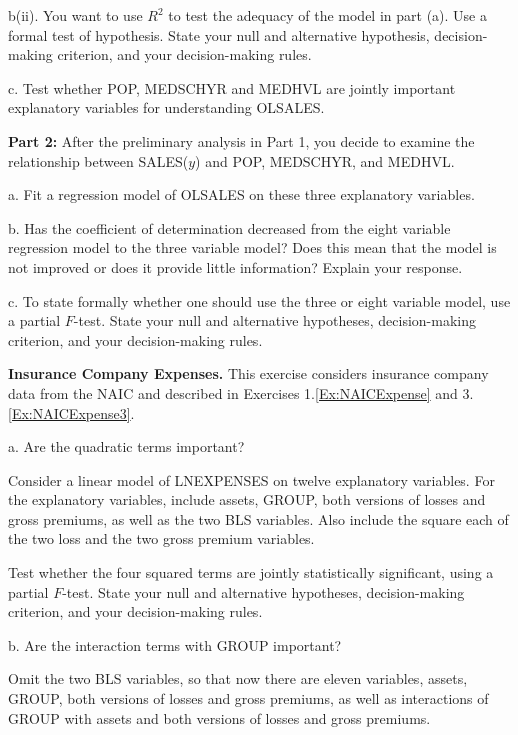 \begin{exercises}
b(ii). You want to use $R^2$ to test the adequacy of the model in
part (a). Use a formal test of hypothesis. State your null and
alternative hypothesis, decision-making criterion, and your
decision-making rules.

c. Test whether POP, MEDSCHYR and MEDHVL are jointly important
explanatory variables for understanding OLSALES.


\textbf{Part 2:} After the preliminary analysis in Part 1, you
decide to examine the relationship between SALES($y$) and POP,
MEDSCHYR, and MEDHVL.

a. Fit a regression model of OLSALES on these three explanatory
variables.

b. Has the coefficient of determination decreased from the eight
variable regression model to the three variable model? Does this
mean that the model is not improved or does it provide little
information? Explain your response.

c. To state formally whether one should use the three or eight
variable model, use a partial $F$-test. State your null and
alternative hypotheses, decision-making criterion, and your
decision-making rules.


\item \textbf{Insurance Company Expenses.}\label{Ex:NAICExpense4}
This exercise considers insurance company data from the NAIC and
described in Exercises 1.\ref{Ex:NAICExpense} and
3.\ref{Ex:NAICExpense3}.


a. Are the quadratic terms important?

Consider a linear model of LNEXPENSES on twelve explanatory
variables. For the explanatory variables, include assets, GROUP,
both versions of losses and gross premiums, as well as the two BLS
variables. Also include the square each of the two loss and the two
gross premium variables.

Test whether the four squared terms are jointly statistically
significant, using a partial $F$-test. State your null and
alternative hypotheses, decision-making criterion, and your
decision-making rules.

b. Are the interaction terms with GROUP important?

Omit the two BLS variables, so that now there are eleven variables,
assets, GROUP, both versions of losses and gross premiums, as well
as interactions of GROUP with assets and both versions of losses and
gross premiums.


\end{exercises}
